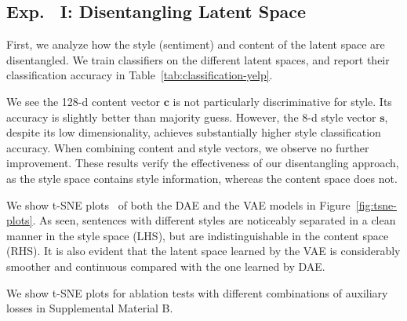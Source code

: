 \documentclass[11pt,a4paper]{article}
\begin{document}
\subsection{Exp.~ I: Disentangling Latent Space}

First, we analyze how the style (sentiment) and content of the latent space are disentangled.
We train classifiers on the different latent spaces, and report their classification accuracy in Table~\ref{tab:classification-yelp}.

We see the 128-d content vector $\bm c$ is not particularly discriminative for style.
Its accuracy is slightly better than majority guess.
However, the 8-d style vector $\bm s$, despite its low dimensionality, achieves substantially higher style classification accuracy.
When combining content and style vectors, we observe no further improvement.
These results verify the effectiveness of our disentangling approach, as the style space contains style information, whereas the content space does not.

We show t-SNE plots~\cite{maaten2008visualizing} of both the DAE and the VAE models in Figure~\ref{fig:tsne-plots}.
As seen, sentences with different styles are noticeably separated in a clean manner in the style space (LHS), but are indistinguishable in the content space (RHS).
It is also evident that the latent space learned by the VAE is considerably smoother and continuous compared with the one learned by DAE.

	{\color{red} We show t-SNE plots for ablation tests with different combinations of auxiliary losses in Supplemental Material B.}
\end{document}
